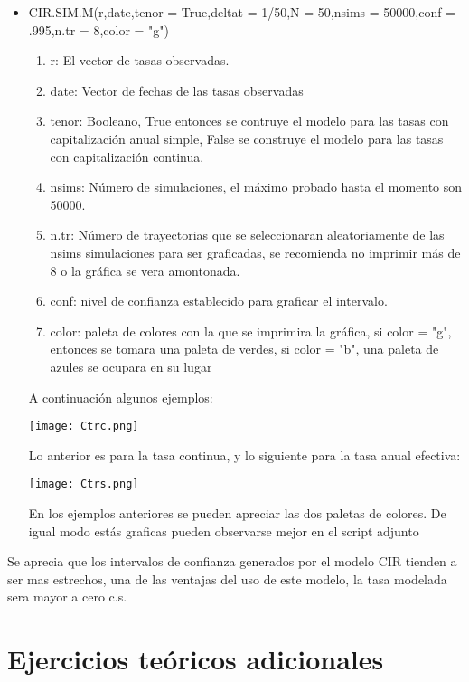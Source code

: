 \documentclass[11pt,notitlepage]{article}
\begin{document}
\begin{itemize}
    \item CIR.SIM.M(r,date,tenor = True,deltat = 1/50,N = 50,nsims = 50000,conf = .995,n.tr = 8,color = "g")
            \begin{enumerate}
                \item r: El vector de tasas observadas. 
                \item date: Vector de fechas de las tasas observadas
                \item tenor: Booleano, True entonces se contruye el modelo para las tasas con capitalización anual simple, False se construye el modelo para las tasas con capitalización continua. 
                \item nsims: Número de simulaciones, el máximo probado hasta el momento son 50000.
                \item n.tr: Número de trayectorias que se seleccionaran aleatoriamente de las nsims simulaciones para ser graficadas, 
                se recomienda no imprimir más de 8 o la gráfica se vera amontonada.
                \item conf: nivel de confianza establecido para graficar el intervalo.
                \item color: paleta de colores con la que se imprimira la gráfica, si color = "g", entonces se tomara una paleta
                de verdes, si color = "b", una paleta de azules se ocupara en su lugar
            \end{enumerate}
   A continuación algunos ejemplos: 
    \begin{center}
       \texttt{[image: Ctrc.png]} 
    \end{center}
  Lo anterior es para la tasa continua, y lo siguiente para la tasa anual efectiva:
    \begin{center}
       \texttt{[image: Ctrs.png]} 
    \end{center}
  En los ejemplos anteriores se pueden apreciar las dos paletas de colores. De igual modo estás graficas pueden observarse mejor en el script adjunto
\end{itemize}
Se aprecia que los intervalos de confianza generados por el modelo CIR tienden a ser mas estrechos, una de las ventajas del uso de este modelo, la tasa modelada sera mayor a cero c.s. 

\section{Ejercicios teóricos adicionales}
\end{document}

